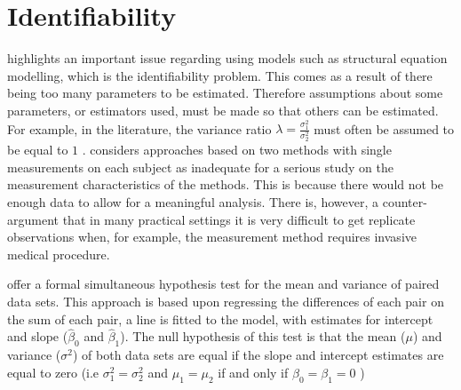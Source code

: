 \documentclass[12pt, a4paper]{report}
\theoremstyle{plain}
\theoremstyle{definition}
\theoremstyle{remark}
\begin{document}
	
	\section{Identifiability}
	\citet{DunnSEME} highlights an important issue regarding using models such as structural equation modelling, which is the identifiability problem. This comes as a
	result of there being too many parameters to be estimated. Therefore assumptions about some parameters, or estimators used, must be made so that others can be estimated. For example, in the literature, the variance ratio $\lambda=\frac{\sigma^{2}_{1}}{\sigma^{2}_{2}}$
	must often be assumed to be equal to $1$ \citep{linnet98}. \citet{DunnSEME} considers approaches based on two methods with single measurements on each subject as inadequate for a serious
	study on the measurement characteristics of the methods. This is because there would not be enough data to allow for a meaningful
	analysis. There is, however, a counter-argument that in many practical settings it is very difficult to get replicate observations when, for example, the measurement method requires invasive medical
	procedure.
	
	\citet{BB89} offer a formal simultaneous hypothesis test for the mean and variance of paired data sets. This approach is based upon regressing the differences of each pair on the sum of each pair, a
	line is fitted to the model, with estimates for intercept and
	slope ($\hat{\beta}_{0}$ and $\hat{\beta}_{1}$). The null
	hypothesis of this test is that the mean ($\mu$) and variance
	($\sigma^{2}$) of both data sets are equal if the slope and
	intercept estimates are equal to zero (i.e $\sigma^{2}_{1} =
	\sigma^{2}_{2}$ and $\mu_{1}=\mu_{2}$ if and only if $\beta_{0}=
	\beta_{1}=0$ )
	
\end{document}
